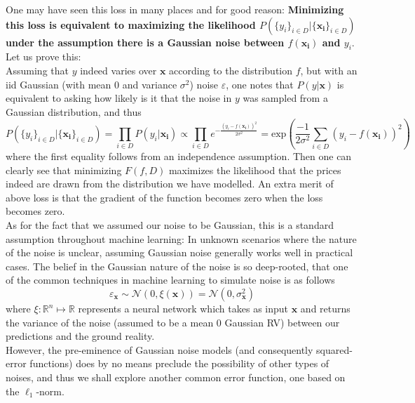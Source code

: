 \documentclass[12pt]{article}
\begin{document}
One may have seen this loss in many places and for good reason: \textbf{Minimizing this loss is equivalent to maximizing the likelihood $P(\{y_i\}_{i\in D}|\{\boldsymbol{x_i}\}_{i\in D})$ under the assumption there is a Gaussian noise between $f(\boldsymbol{x_i})$ and $y_i$}.\\
Let us prove this:\\
Assuming that $y$ indeed varies over $\boldsymbol{x}$ according to the distribution $f$, but with an iid Gaussian (with mean $0$ and variance $\sigma^2$) noise $\varepsilon$, one notes that $P(y|\boldsymbol{x})$ is equivalent to asking how likely is it that the noise in $y$ was sampled from a Gaussian distribution, and thus
$$P(\{y_i\}_{i\in D}|\{\boldsymbol{x_i}\}_{i\in D}) = \prod_{i\in D}P(y_i|\boldsymbol{x_i})\propto\prod_{i\in D}e^{-\frac{(y_i - f(\boldsymbol{x_i}))^2}{2\sigma^2}} = \mathrm{exp}\left(\frac{-1}{2\sigma^2}\sum_{i\in D}(y_i - f(\boldsymbol{x_i}))^2\right)$$
where the first equality follows from an independence assumption. Then one can clearly see that minimizing $F(f, D)$ maximizes the likelihood that the prices indeed are drawn from the distribution we have modelled. An extra merit of above loss is that the gradient of the function becomes zero when the loss becomes zero. \\
As for the fact that we assumed our noise to be Gaussian, this is a standard assumption throughout machine learning: In unknown scenarios where the nature of the noise is unclear, assuming Gaussian noise generally works well in practical cases. The belief in the Gaussian nature of the noise is so deep-rooted, that one of the common techniques in machine learning to simulate noise is as follows
$$\varepsilon_{\boldsymbol{x}}\sim\mathcal{N}(0, \xi(\boldsymbol{x})) = \mathcal{N}(0, \sigma_{\boldsymbol{x}}^2)$$
where $\xi:\mathbb{R}^n\mapsto\mathbb{R}$ represents a neural network which takes as input $\boldsymbol{x}$ and returns the variance of the noise (assumed to be a mean $0$ Gaussian RV) between our predictions and the ground reality.\\
However, the pre-eminence of Gaussian noise models (and consequently squared-error functions) does by no means preclude the possibility of other types of noises, and thus we shall explore another common error function, one based on the $\ell_1$-norm.
\end{document}
